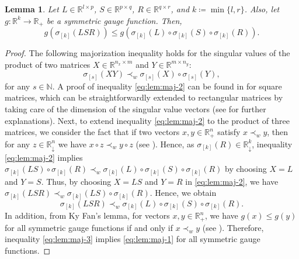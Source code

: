 \documentclass[pdflatex,sn-mathphys-num]{sn-jnl}%
\theoremstyle{thmstyleone}
\newtheorem{lemma}[theorem]{Lemma}
\begin{document}
\begin{lemma}
\label{lem:maj}
Let $L\in\mathbb{R}^{l\times p}$, $S\in\mathbb{R}^{p\times q}$, $R\in\mathbb{R}^{q\times r}$, and $k\coloneqq\min\{l,r\}$. Also, let $g:\mathbb{R}^k\rightarrow \mathbb{R}_+$ be a symmetric gauge function. Then,
\begin{equation}
\label{eq:lem:maj-1}
g(\sigma_{[k]}(LSR))\leq g(\sigma_{[k]}(L)\circ \sigma_{[k]}(S)\circ \sigma_{[k]}(R)).
\end{equation}
\end{lemma}
\begin{proof}
The following majorization inequality holds for the singular values of the product of two matrices $X\in\mathbb{R}^{n_x\times m}$ and $Y\in\mathbb{R}^{m\times n_y}$:
\begin{equation}
\label{eq:lem:maj-2}
\sigma_{[s]}(XY)\prec_w \sigma_{[s]}(X)\circ \sigma_{[s]}(Y),
\end{equation}
for any $s\in\mathbb{N}$. A proof of inequality \eqref{eq:lem:maj-2} can be found in \cite[p. 342]{marshall2011inequalities} for square matrices, which can be straightforwardly extended to rectangular matrices by taking care of the dimension of the singular value vectors (see \cite[p. 299]{marshall2011inequalities} for further explanations). Next, to extend inequality \eqref{eq:lem:maj-2} to the product of three matrices, we consider the fact that if two vectors $x,y\in\mathbb{R}^n_+$ satisfy $x\prec_w y$, then for any $z\in\mathbb{R}_\downarrow^n$ we have $x\circ z\prec_w y\circ z$ (see \cite[Prob. 11.5.16]{bhatia2013matrix}). Hence, as $\sigma_{[k]}(R)\in\mathbb{R}_\downarrow^k$, inequality \eqref{eq:lem:maj-2} implies $\sigma_{[k]}(LS)\circ\sigma_{[k]}(R)\prec_w \sigma_{[k]}(L)\circ \sigma_{[k]}(S)\circ\sigma_{[k]}(R)$ by choosing $X=L$ and $Y=S$. Thus, by choosing $X=LS$ and $Y=R$ in \eqref{eq:lem:maj-2}, we have $\sigma_{[k]}(LSR)\prec_w \sigma_{[k]}(LS)\circ \sigma_{[k]}(R)$. Hence, we obtain
\begin{equation}
\label{eq:lem:maj-3}
\sigma_{[k]}(LSR)\prec_w \sigma_{[k]}(L)\circ \sigma_{[k]}(S)\circ \sigma_{[k]}(R).
\end{equation}
In addition, from Ky Fan's lemma, for vectors $x,y\in\mathbb{R}^n_+$, we have $g(x)\leq g(y)$ for all symmetric gauge functions if and only if $x\prec_w y$ (see \cite[Prop. 4.B.6]{marshall2011inequalities}). Therefore, inequality \eqref{eq:lem:maj-3} implies \eqref{eq:lem:maj-1} for all symmetric gauge functions. 
\end{proof}
\end{document}
